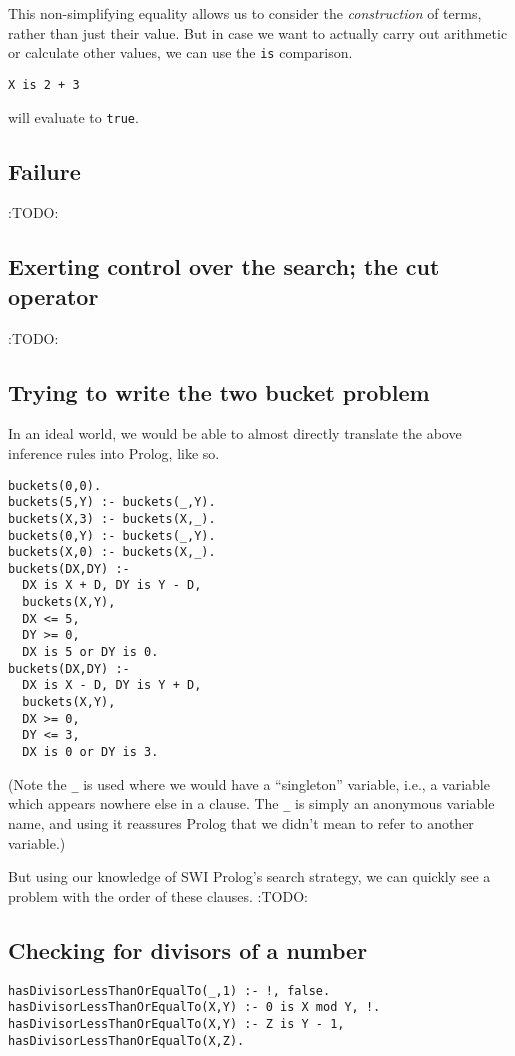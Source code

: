 \documentclass[11pt]{article}
\begin{document}
This non-simplifying equality allows us to consider
the \emph{construction} of terms, rather than just their value.
But in case we want to actually carry out arithmetic
or calculate other values,
we can use the \texttt{is} comparison.
\begin{verbatim}
X is 2 + 3
\end{verbatim}
will evaluate to \texttt{true}.

\subsection{Failure}
\label{sec:orgdb4bb9a}
:TODO:

\subsection{Exerting control over the search; the cut operator}
\label{sec:org67d0c36}
:TODO:

\subsection{Trying to write the two bucket problem}
\label{sec:org89af7b8}
In an ideal world, we would be able to almost directly translate
the above inference rules into Prolog, like so.
\begin{verbatim}
buckets(0,0).
buckets(5,Y) :- buckets(_,Y).
buckets(X,3) :- buckets(X,_).
buckets(0,Y) :- buckets(_,Y).
buckets(X,0) :- buckets(X,_).
buckets(DX,DY) :-
  DX is X + D, DY is Y - D,
  buckets(X,Y),
  DX <= 5,
  DY >= 0,
  DX is 5 or DY is 0.
buckets(DX,DY) :-
  DX is X - D, DY is Y + D,
  buckets(X,Y),
  DX >= 0,
  DY <= 3,
  DX is 0 or DY is 3.
\end{verbatim}
(Note the \texttt{\_} is used where we would have a “singleton” variable,
i.e., a variable which appears nowhere else in a clause.
The \texttt{\_} is simply an anonymous variable name, and using it
reassures Prolog that we didn't mean to refer to another variable.)

But using our knowledge of SWI Prolog's search strategy,
we can quickly see a problem with the order of these clauses.
:TODO:

\subsection{Checking for divisors of a number}
\label{sec:org9432f78}
\begin{verbatim}
hasDivisorLessThanOrEqualTo(_,1) :- !, false.
hasDivisorLessThanOrEqualTo(X,Y) :- 0 is X mod Y, !.
hasDivisorLessThanOrEqualTo(X,Y) :- Z is Y - 1, hasDivisorLessThanOrEqualTo(X,Z).
\end{verbatim}
\end{document}
